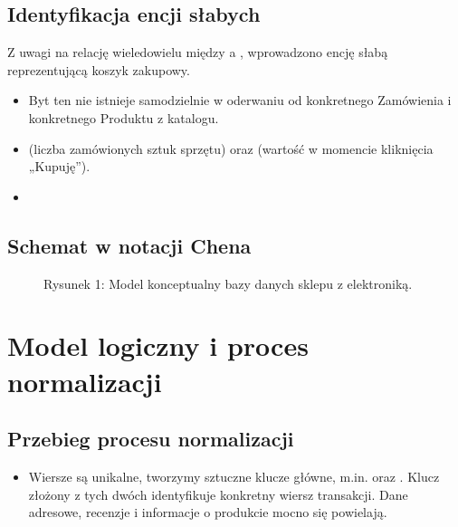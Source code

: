 \documentclass[letterpaper,10pt,polish]{sphinxmanual}
\begin{document}
\subsection{Identyfikacja encji słabych}
\label{\detokenize{rozdzia_u0142_3/BD_PlanBazyDanych_zad1/index:identyfikacja-encji-slabych}}
\sphinxAtStartPar
Z uwagi na relację wiele\sphinxhyphen{}do\sphinxhyphen{}wielu między  a , wprowadzono encję słabą reprezentującą koszyk zakupowy.
\begin{itemize}
\item {} 
\sphinxAtStartPar
{} Byt ten nie istnieje samodzielnie w oderwaniu od konkretnego Zamówienia i konkretnego Produktu z katalogu.

\item {} 
\sphinxAtStartPar
{}  (liczba zamówionych sztuk sprzętu) oraz  (wartość w momencie kliknięcia „Kupuję”).

\item {} 
\sphinxAtStartPar
{} 

\end{itemize}


\subsection{Schemat w notacji Chena}
\label{\detokenize{rozdzia_u0142_3/BD_PlanBazyDanych_zad1/index:schemat-w-notacji-chena}}
\begin{figure}[htbp]
\centering
\capstart

\noindent{}
\caption{Rysunek 1: Model konceptualny bazy danych sklepu z elektroniką.}\label{\detokenize{rozdzia_u0142_3/BD_PlanBazyDanych_zad1/index:id1}}\end{figure}


\section{Model logiczny i proces normalizacji}
\label{\detokenize{rozdzia_u0142_3/BD_PlanBazyDanych_zad1/index:model-logiczny-i-proces-normalizacji}}

\subsection{Przebieg procesu normalizacji}
\label{\detokenize{rozdzia_u0142_3/BD_PlanBazyDanych_zad1/index:przebieg-procesu-normalizacji}}
\sphinxAtStartPar
{}
\begin{itemize}
\item {} 
\sphinxAtStartPar
Wiersze są unikalne, tworzymy sztuczne klucze główne, m.in.  oraz . Klucz złożony z tych dwóch identyfikuje konkretny wiersz transakcji. Dane adresowe, recenzje i informacje o produkcie mocno się powielają.

\end{itemize}
\end{document}

